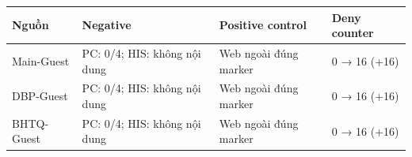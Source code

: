 \begin{tabularx}{\linewidth}{@{}lXXX@{}}\toprule
Nguồn & Negative & Positive control & Deny counter\\\midrule
Main-Guest & PC: 0/4; HIS: không nội dung & Web ngoài đúng marker & 0 → 16 (+16)\\
DBP-Guest & PC: 0/4; HIS: không nội dung & Web ngoài đúng marker & 0 → 16 (+16)\\
BHTQ-Guest & PC: 0/4; HIS: không nội dung & Web ngoài đúng marker & 0 → 16 (+16)\\
\bottomrule\end{tabularx}
